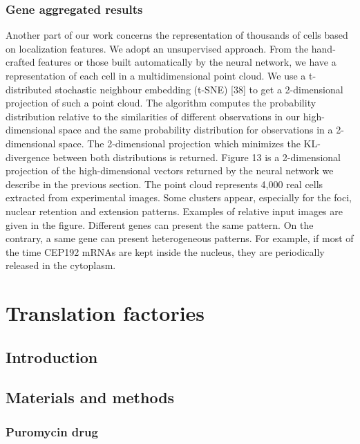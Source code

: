 \subsubsection{Gene aggregated results}

Another part of our work concerns the representation of thousands of cells
based on localization features. We adopt an unsupervised approach. From the
hand-crafted features or those built automatically by the neural network, we
have a representation of each cell in a multidimensional point cloud. We use
a t-distributed stochastic neighbour embedding (t-SNE) [38] to get a 2-dimensional
projection of such a point cloud. The algorithm computes the probability distribution
relative to the similarities of different observations in our high-dimensional
space and the same probability distribution for observations in a 2-dimensional
space. The 2-dimensional projection which minimizes the KL-divergence between
both distributions is returned. Figure 13 is a 2-dimensional projection of the
high-dimensional vectors returned by the neural network we describe in the
previous section. The point cloud represents 4,000 real cells extracted from
experimental images. Some clusters appear, especially for the foci, nuclear
retention and extension patterns. Examples of relative input images are given
in the figure. Different genes can present the same pattern. On the contrary,
a same gene can present heterogeneous patterns. For example, if most of the
time CEP192 mRNAs are kept inside the nucleus, they are periodically released
in the cytoplasm.

\section{Translation factories}
\label{sec:translation_factories}

\subsection{Introduction}
\label{subsec:introduction_translation_factories}

\subsection{Materials and methods}
\label{subsec:materials_translation_factories}

\subsubsection{Puromycin drug}

